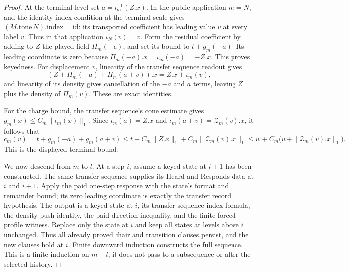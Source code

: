 \begin{proof}
At the terminal level set $a=\iota_m^{-1}(Z.x)$. In the public application
$m=N$, and the identity-index condition at the terminal scale gives
$(M.\mathrm{tone}\,N).\mathrm{index}=\mathrm{id}$: its transported coefficient
has leading value $v$ at every label $v$. Thus in that application
$\iota_N(v)=v$. Form the residual
coefficient by adding to $Z$ the played field $\Pi_m(-a)$, and set its bound
to $t+g_m(-a)$. Its leading coordinate is zero because
$\Pi_m(-a).x=\iota_m(-a)=-Z.x$. This proves keyedness. For displacement $v$,
linearity of the transfer sequence readout gives
\[
 (Z+\Pi_m(-a)+\Pi_m(a+v)).x=Z.x+\iota_m(v),
\]
and linearity of its density gives cancellation of the $-a$ and $a$
terms, leaving $Z$ plus the density of $\Pi_m(v)$. These are exact
identities.

For the charge bound, the transfer sequence's cone estimate gives
$g_m(x)\leq C_m\|\iota_m(x)\|_1$. Since $\iota_m(a)=Z.x$ and
$\iota_m(a+v)=\mathcal Z_m(v).x$, it follows that
\[
 c_m(v)=t+g_m(-a)+g_m(a+v)
 \leq t+C_m\|Z.x\|_1+C_m\|\mathcal Z_m(v).x\|_1
 \leq w+C_m\bigl(w+\|\mathcal Z_m(v).x\|_1\bigr).
\]
This is the displayed terminal bound.

We now descend from $m$ to $l$. At a step $i$, assume a keyed state at
$i+1$ has been constructed. The same transfer sequence supplies its Heard and
Responds data at $i$ and $i+1$. Apply the paid one-step response with the
state's format and remainder bound; its zero leading coordinate is exactly
the transfer record hypothesis. The output is a keyed state at $i$, its transfer sequence-index
formula, the density push identity, the paid direction inequality, and the
finite forced-profile witness. Replace only the state
at $i$ and keep all states at levels above $i$ unchanged. Thus all already
proved chair and transition clauses persist, and the new clauses hold at
$i$. Finite downward induction constructs the full sequence. This is a
finite induction on $m-l$; it does not pass to a subsequence or alter the
selected history.


\end{proof}

